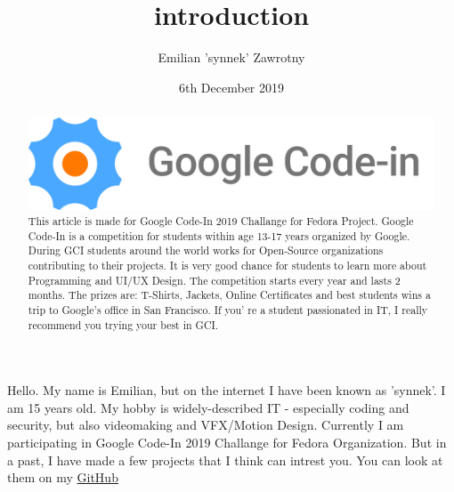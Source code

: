 \documentclass{article}
\title{introduction}
\author{Emilian 'synnek' Zawrotny}
\date{6th December 2019}
\begin{document}
\begin{abstract}
\includegraphics[scale=0.1]{./GCI-new-logo.jpg}
This article is made for Google Code-In 2019 Challange for Fedora Project.
Google Code-In is a competition for students within age 13-17 years organized by Google.
During GCI students around the world works for Open-Source organizations contributing to their projects.
It is very good chance for students to learn more about Programming and UI/UX Design. The competition starts
every year and lasts 2 months. The prizes are: T-Shirts, Jackets, Online Certificates and best students wins
a trip to Google's office in San Francisco. If you' re a student passionated in IT, I really recommend you trying your best in GCI.

\end{abstract}
Hello. My name is Emilian, but on the internet I have been known as 'synnek'. I am 15 years old. My hobby is widely-described IT - especially coding and security, but also videomaking and VFX/Motion Design.
Currently I am participating in Google Code-In 2019 Challange for Fedora Organization. But in a past, I have made a few projects that I think can intrest you. You can look at them on my \href{https://github.com/synnek1337/}{GitHub}
\end{document}
